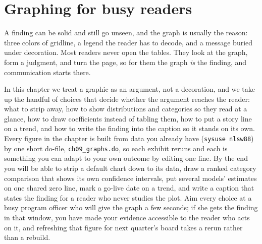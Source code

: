 \documentclass[
    a4paper,
    fontsize=10pt,
    twoside=true,
    numbers=noenddot,
]{kaobook}
\begin{document}


\chapter{Graphing for busy readers}\label{ch:graphs}

A finding can be solid and still go unseen, and the graph is usually the reason: three colors of gridline, a legend the reader has to decode, and a message buried under decoration. Most readers never open the tables. They look at the graph, form a judgment, and turn the page, so for them the graph \emph{is} the finding, and communication starts there.

In this chapter we treat a graphic as an argument, not a decoration, and we take up the handful of choices that decide whether the argument reaches the reader: what to strip away, how to show distributions and categories so they read at a glance, how to draw coefficients instead of tabling them, how to put a story line on a trend, and how to write the finding into the caption so it stands on its own. Every figure in the chapter is built from data you already have (\texttt{sysuse nlsw88}) by one short do-file, \texttt{ch09\_graphs.do}, so each exhibit reruns and each is something you can adapt to your own outcome by editing one line. By the end you will be able to strip a default chart down to its data, draw a ranked category comparison that shows its own confidence intervals, put several models' estimates on one shared zero line, mark a go-live date on a trend, and write a caption that states the finding for a reader who never studies the plot. Aim every choice at a busy program officer who will give the graph a few seconds; if she gets the finding in that window, you have made your evidence accessible to the reader who acts on it, and refreshing that figure for next quarter's board takes a rerun rather than a rebuild.
\end{document}
